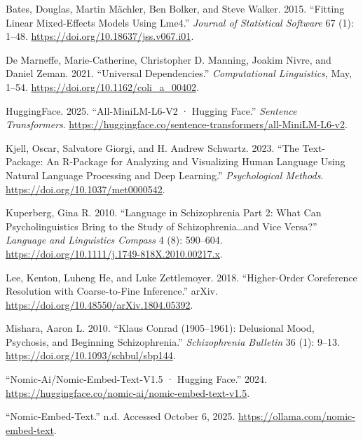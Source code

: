 \documentclass[
  12pt,
  oneside]{book}
\newlength{\cslhangindent}
\newenvironment{CSLReferences}[2] %
 {\begin{list}{}{%
  \setlength{\itemindent}{0pt}
  \setlength{\leftmargin}{0pt}
  \setlength{\parsep}{0pt}
  \ifodd #1
   \setlength{\leftmargin}{\cslhangindent}
   \setlength{\itemindent}{-1\cslhangindent}
  \fi
  \setlength{\itemsep}{#2\baselineskip}}}
 {\end{list}}
\begin{document}
\label{refs}
\begin{CSLReferences}{1}{0}
Bates, Douglas, Martin Mächler, Ben Bolker, and Steve Walker. 2015. {``Fitting {Linear} {Mixed}-{Effects} {Models} {Using} Lme4.''} \emph{Journal of Statistical Software} 67 (1): 1--48. \url{https://doi.org/10.18637/jss.v067.i01}.

De Marneffe, Marie-Catherine, Christopher D. Manning, Joakim Nivre, and Daniel Zeman. 2021. {``Universal {Dependencies}.''} \emph{Computational Linguistics}, May, 1--54. \url{https://doi.org/10.1162/coli_a_00402}.

HuggingFace. 2025. {``All-{MiniLM}-{L6}-V2 · {Hugging} {Face}.''} \emph{Sentence Transformers}. \url{https://huggingface.co/sentence-transformers/all-MiniLM-L6-v2}.

Kjell, Oscar, Salvatore Giorgi, and H. Andrew Schwartz. 2023. {``The Text-Package: {An} {R}-Package for {Analyzing} and {Visualizing} {Human} {Language} {Using} {Natural} {Language} {Processing} and {Deep} {Learning}.''} \emph{Psychological Methods}. \url{https://doi.org/10.1037/met0000542}.

Kuperberg, Gina R. 2010. {``Language in Schizophrenia {Part} 2: {What} Can Psycholinguistics Bring to the Study of Schizophrenia\ldots and Vice Versa?''} \emph{Language and Linguistics Compass} 4 (8): 590--604. \url{https://doi.org/10.1111/j.1749-818X.2010.00217.x}.

Lee, Kenton, Luheng He, and Luke Zettlemoyer. 2018. {``Higher-Order {Coreference} {Resolution} with {Coarse}-to-Fine {Inference}.''} arXiv. \url{https://doi.org/10.48550/arXiv.1804.05392}.

Mishara, Aaron L. 2010. {``Klaus {Conrad} (1905--1961): {Delusional} {Mood}, {Psychosis}, and {Beginning} {Schizophrenia}.''} \emph{Schizophrenia Bulletin} 36 (1): 9--13. \url{https://doi.org/10.1093/schbul/sbp144}.

{``Nomic-Ai/Nomic-Embed-Text-V1.5 · {Hugging} {Face}.''} 2024. \url{https://huggingface.co/nomic-ai/nomic-embed-text-v1.5}.

{``Nomic-Embed-Text.''} n.d. Accessed October 6, 2025. \url{https://ollama.com/nomic-embed-text}.


\end{CSLReferences}
\end{document}
